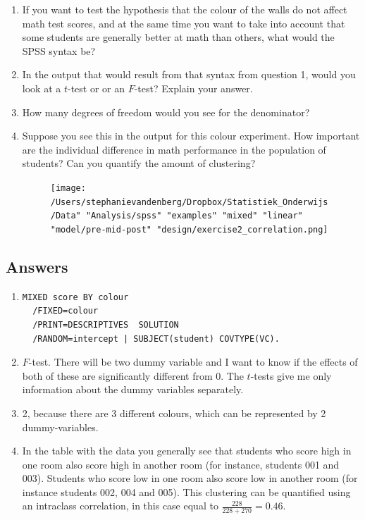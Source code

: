 \documentclass[]{book}\usepackage[]{graphicx}\usepackage[]{color}
\begin{document}
\begin{enumerate}
\item If you want to test the hypothesis that the colour of the walls do not affect math test scores, and at the same time you want to take into account that some students are generally better at math than others, what would the SPSS syntax be? 
\item In the output that would result from that syntax from question 1, would you look at a $t$-test or or an $F$-test? Explain your answer.
\item How many degrees of freedom would you see for the denominator?
\item Suppose you see this in the output for this colour experiment. How important are the individual difference in math performance in the population of students? Can you quantify the amount of clustering?



\begin{figure}[h]
    \begin{center}
       \texttt{[image: /Users/stephanievandenberg/Dropbox/Statistiek\_Onderwijs/Data" "Analysis/spss" "examples" "mixed" "linear" "model/pre-mid-post" "design/exercise2\_correlation.png]}
    \end{center}
\end{figure}

\end{enumerate}


\subsection{Answers}

\begin{enumerate}
\item 

\begin{verbatim}
MIXED score BY colour
  /FIXED=colour
  /PRINT=DESCRIPTIVES  SOLUTION
  /RANDOM=intercept | SUBJECT(student) COVTYPE(VC).
\end{verbatim}

\item  $F$-test. There will be two dummy variable and I want to know if the effects of both of these are significantly different from 0. The $t$-tests  give me only information about the dummy variables separately. \\
\item  2, because there are 3 different colours, which can be represented by 2 dummy-variables. \\
\item  In the table with the data you generally see that students who score high in one room also score high in another room (for instance, students 001 and 003). Students who score low in one room also score low in another room (for instance students 002, 004 and 005). This clustering can be quantified using an intraclass correlation, in this case equal to $\frac{228}{228+270}=0.46$. 
\end{enumerate}
\end{document}
